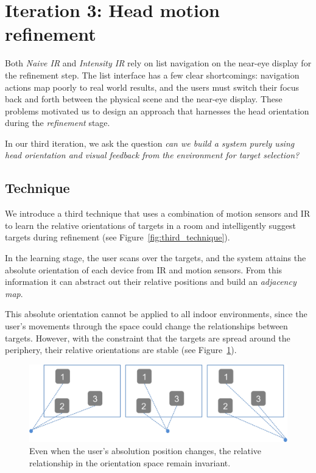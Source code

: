 \section{Iteration 3: Head motion refinement}
\label{sec:iteration-3:-head}

Both {\em Naive IR} and {\em Intensity IR} rely on list navigation on the near-eye display for the refinement step. The list interface has a few clear shortcomings: navigation actions map poorly to real world results, and the users must switch their focus back and forth between the physical scene and the near-eye display. These problems motivated us to design an approach that harnesses the head orientation during the {\em refinement} stage.

In our third iteration, we ask the question {\em can we build a system purely using head orientation and visual feedback from the environment for target selection?}

\subsection{Technique}

We introduce a third technique that uses a combination of motion sensors and IR to learn the relative orientations of
targets in a room and intelligently suggest targets during refinement (see
Figure~\ref{fig:third_technique}).

In the learning stage, the user scans over the targets, and the
system attains the absolute orientation of each device from IR and motion sensors. From this information it can abstract out their relative positions and build an {\em adjacency map}.

This absolute orientation cannot be applied to all indoor
environments, since the user’s movements through the space could change the relationships between targets. However, with the constraint that the targets are spread around the periphery, their relative orientations are stable
(see Figure~\ref{fig:third_principle}). 

\begin{figure}[t]
\centering
\includegraphics[width=1\columnwidth]{figures/third_principle.png}
\caption{Even when the user's absolution position changes, the relative relationship in the orientation space remain invariant.}
\label{fig:third_principle}
\end{figure}

